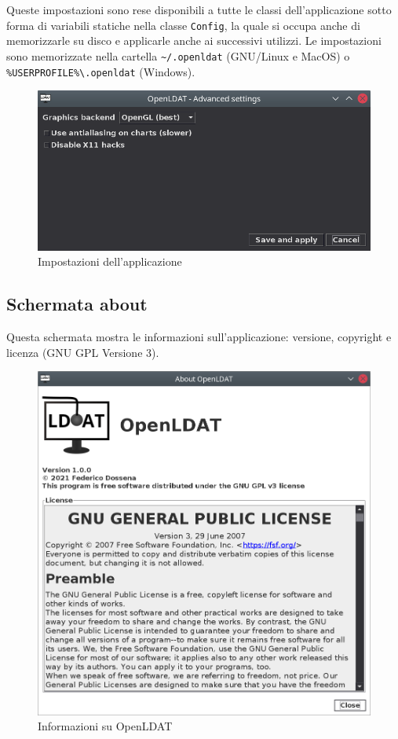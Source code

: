 Queste impostazioni sono rese disponibili a tutte le classi dell'applicazione sotto forma di variabili statiche nella classe \texttt{Config}, la quale si occupa anche di memorizzarle su disco e applicarle anche ai successivi utilizzi. Le impostazioni sono memorizzate nella cartella \texttt{\textasciitilde/.openldat} (GNU/Linux e MacOS) o \texttt{\%USERPROFILE\%\textbackslash.openldat} (Windows).

\begin{figure}[H]
	\centering
	\includegraphics[width=.8\textwidth]{Applicazione_files/gui_settings.png}
	\caption{Impostazioni dell'applicazione}
	\label{fig:gui_settings}
\end{figure}

\subsection{Schermata about}
Questa schermata mostra le informazioni sull'applicazione: versione, copyright e licenza (GNU GPL Versione 3).

\begin{figure}[H]
	\centering
	\includegraphics[width=.8\textwidth]{Applicazione_files/gui_about.png}
	\caption{Informazioni su OpenLDAT}
	\label{fig:gui_about}
\end{figure}

